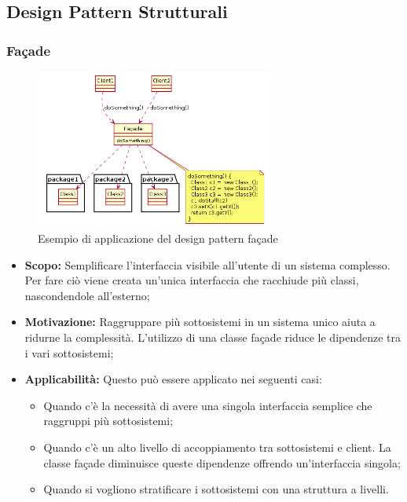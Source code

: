 \documentclass{scalatekids-article}
\begin{document}
\subsection{Design Pattern Strutturali}

\subsubsection{Façade}

\begin{figure}[H]
  \begin{center}
    \includegraphics[width=0.7\textwidth, keepaspectratio]{img/designPattern/Facade.png}
    \caption{Esempio di applicazione del design pattern façade}
  \end{center}
\end{figure}

\begin{itemize}

\item \textbf{Scopo:} Semplificare l'interfaccia visibile all'utente di un sistema complesso.
Per fare ciò viene creata un'unica interfaccia che racchiude più classi, nascondendole all'esterno;

\item \textbf{Motivazione:} Raggruppare più sottosistemi in un sistema unico aiuta a ridurne la complessità.
L'utilizzo di una classe façade riduce le dipendenze tra i vari sottosistemi;

\item \textbf{Applicabilità:} Questo  può essere
applicato nei seguenti casi:
  \begin{itemize}
  \item Quando c'è la necessità di avere una singola interfaccia semplice che raggruppi più sottosistemi;
  \item Quando c'è un alto livello di accoppiamento tra sottosistemi e client. La
  classe façade diminuisce queste dipendenze offrendo un'interfaccia singola;
  \item Quando si vogliono stratificare i sottosistemi con una struttura a livelli.
  \end{itemize}

\end{itemize}
\end{document}
